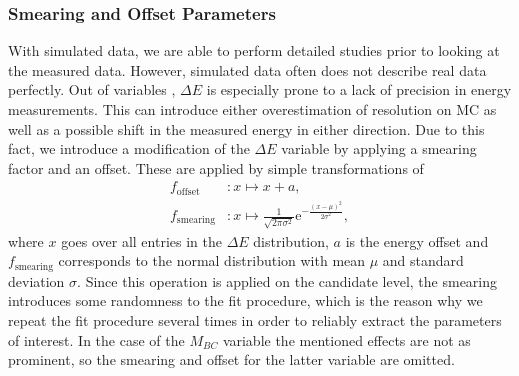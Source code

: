 \subsubsection{Smearing and Offset Parameters}\label{sec:smearing-and-offset-parameters}
With simulated data, we are able to perform detailed studies prior to looking at the measured data. However, simulated data often does not describe real data perfectly. Out of variables \vars, $\Delta E$ is especially prone to a lack of precision in energy measurements. This can introduce either overestimation of resolution on MC as well as a possible shift in the measured energy in either direction. Due to this fact, we introduce a modification of the $\Delta E$ variable by applying a smearing factor and an offset. These are applied by simple transformations of 
\begin{align}
\label{eq:smearingoffset}
f_{\mathrm{offset}}&: x \mapsto x + a, \\
f_{\mathrm{smearing}}&: x \mapsto \frac{1}{\sqrt{2\pi \sigma^2}} \mathrm{e}^{-\frac{(x-\mu)^2}{2\sigma^2}},
\end{align}
where $x$ goes over all entries in the $\Delta E$ distribution, $a$ is the energy offset and $f_{\mathrm{smearing}}$ corresponds to the normal distribution with mean $\mu$ and standard deviation $\sigma$. Since this operation is applied on the candidate level, the smearing introduces some randomness to the fit procedure, which is the reason why we repeat the fit procedure several times in order to reliably extract the parameters of interest. In the case of the $M_{BC}$ variable the mentioned effects are not as prominent, so the smearing and offset for the latter variable are omitted. 

